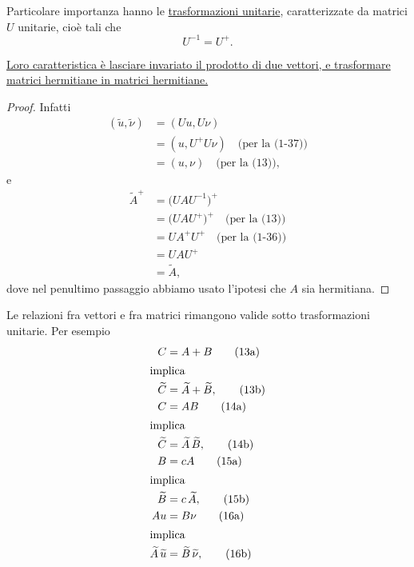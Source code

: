\documentclass[11pt, a4paper]{book}
\numberwithin{equation}{section}
\begin{document}
Particolare importanza hanno le \uline{trasformazioni unitarie},
caratterizzate da matrici $U$ unitarie, cioè tali che
\begin{equation}
U^{-1} = U^+.
\end{equation}


\uline{Loro caratteristica è lasciare invariato il prodotto di due vettori,
e trasformare matrici hermitiane in matrici hermitiane.}

\begin{proof}
Infatti
\begin{align*}
(\widetilde{u}, \widetilde{\nu}) &= (Uu, U\nu) \\
  &= (u, U^+ U\nu) \quad \text{(per la (1-37))} \\
  &= (u, \nu)       \quad \text{(per la (13))},
\end{align*}
e
\begin{align*}
\widetilde{A}^+ &= \bigl(U A U^{-1}\bigr)^+ \\
  &= \bigl(U A U^+\bigr)^+   \quad \text{(per la (13))} \\
  &= U A^+ U^+               \quad \text{(per la (1-36))} \\
  &= U A U^+                                              \\
  &= \widetilde{A},
\end{align*}
dove nel penultimo passaggio abbiamo usato l'ipotesi che $A$ sia
hermitiana.
\end{proof}

Le relazioni fra vettori e fra matrici rimangono valide sotto
trasformazioni unitarie. Per esempio
\begin{align}
C &= A + B  \tag{13a} \\
\shortintertext{implica}
\widetilde{C} &= \widetilde{A} + \widetilde{B}, \tag{13b} \\
C &= AB     \tag{14a} \\
\shortintertext{implica}
\widetilde{C} &= \widetilde{A}\,\widetilde{B}, \tag{14b} \\
B &= cA     \tag{15a} \\
\shortintertext{implica}
\widetilde{B} &= c\,\widetilde{A}, \tag{15b} \\
Au &= B\nu  \tag{16a} \\
\shortintertext{implica}
\widetilde{A}\,\widetilde{u} &= \widetilde{B}\,\widetilde{\nu}, \tag{16b}
\end{align}

\end{document}
